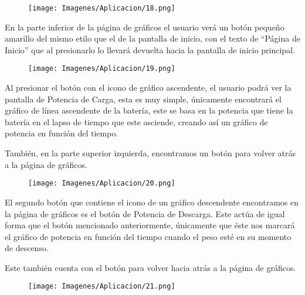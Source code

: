         \begin{figure} [H]
            \centering
            \texttt{[image: Imagenes/Aplicacion/18.png]}
        \end{figure}

        En la parte inferior de la página de gráficos el usuario verá un botón pequeño amarillo del mismo etilo que el de la pantalla de inicio, con el texto de “Página de Inicio” que al presionarlo lo llevará devuelta hacia la pantalla de inicio principal. \par

        \begin{figure} [H]
            \centering
            \texttt{[image: Imagenes/Aplicacion/19.png]}
        \end{figure}

        Al presionar el botón con el icono de gráfico ascendente, el usuario podrá ver la pantalla de Potencia de Carga, esta es muy simple, únicamente encontrará el gráfico de línea ascendente de la batería, este se basa en la potencia que tiene la batería en el lapso de tiempo que este asciende, creando así un gráfico de potencia en función del tiempo.\par
        También, en la parte superior izquierda, encontramos un botón para volver atrás a la página de gráficos.\par

        \begin{figure} [H]
            \centering
            \texttt{[image: Imagenes/Aplicacion/20.png]}
        \end{figure}

        El segundo botón que contiene el icono de un gráfico descendente encontramos en la página de gráficos es el botón de Potencia de Descarga. Este actúa de igual forma que el botón mencionado anteriormente, únicamente que éste nos marcará el gráfico de potencia en función del tiempo cuando el peso esté en su momento de descenso.\par
        Este también cuenta con el botón para volver hacia atrás a la página de gráficos.\par

        \begin{figure} [H]
            \centering
            \texttt{[image: Imagenes/Aplicacion/21.png]}
        \end{figure}